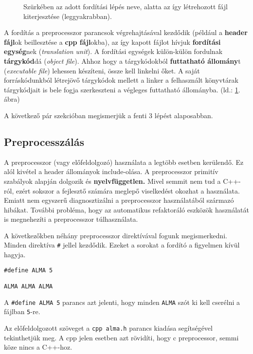\documentclass[../cpp_book/cpp_book.tex]{subfiles}
\begin{document}
	\begin{figure}[!h]
		\centering
		
		
		\smallskip
		\caption{Szürkében az adott fordítási lépés neve, alatta az így létrehozott fájl kiterjesztése (leggyakrabban).}\label{fig_steps_of_compilation}
	\end{figure}
	A fordítás a preprocesszor parancsok végrehajtásával kezdődik (például a \textbf{header fájl}ok beillesztése a \textbf{cpp fájl}okba), az így kapott fájlot hívjuk \textbf{fordítási egység}nek (\textit{translation unit}). A fordítási egységek külön-külön fordulnak \textbf{tárgykód}dá (\textit{object file}). Ahhoz hogy a tárgykódokból \textbf{futtatható állomány}t (\textit{executable file}) lehessen készíteni, össze kell linkelni őket. A saját forráskódunkból létrejövő tárgykódok mellett a linker a felhasznált könyvtárak tárgykódjait is bele fogja szerkeszteni a végleges futtatható állományba. (ld.: \ref{fig_steps_of_compilation}. ábra)
	\medskip
	
	A következő pár szekcióban megismerjük a fenti 3 lépést alaposabban.
	
	\subsection{Preprocesszálás}
	A preprocesszor (vagy előfeldolgozó) használata a legtöbb esetben kerülendő. Ez alól kivétel a header állományok include-olása. A preprocesszor primitív szabályok alapján dolgozik és \textbf{nyelvfüggetlen.} Mivel semmit nem tud a C++-ról, ezért sokszor a fejlesztő számára meglepő viselkedést okozhat a használata. Emiatt nem egyszerű diagnosztizálni a preprocesszor használatából származó hibákat. További probléma, hogy az automatikus refaktoráló eszközök használatát is megnehezíti a preprocesszor túlhasználata.
	
	A következőkben néhány preprocesszor direktívával fogunk megismerkedni. Minden direktíva \texttt{\#} jellel kezdődik. Ezeket a sorokat a fordító a figyelmen kívül hagyja.
  \bigskip
	
	\begin{lstlisting}
#define ALMA 5

ALMA ALMA ALMA
	\end{lstlisting}
	A \texttt{\#define ALMA 5}  parancs azt jelenti, hogy minden \texttt{ALMA} szót ki kell cserélni a fájlban \texttt{5}-re.
	
	Az előfeldolgozott szöveget a \texttt{cpp alma.h} parancs kiadása segítségével tekinthetjük meg. A cpp jelen esetben azt rövidíti, hogy c preprocessor, semmi köze nincs a C++-hoz.
	
\end{document}
